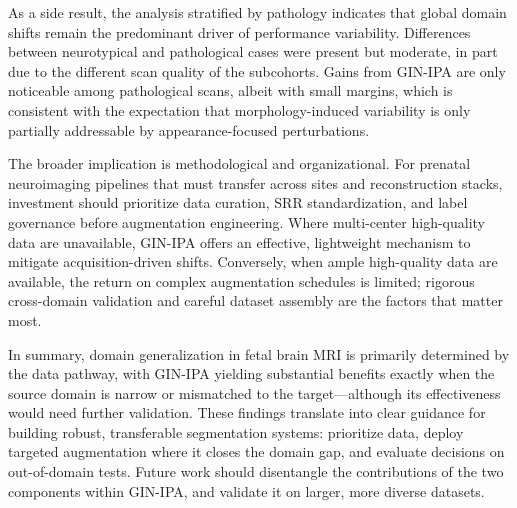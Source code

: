 As a side result, the analysis stratified by pathology indicates that global domain shifts remain the predominant driver of performance variability. Differences between neurotypical and pathological cases were present but moderate, in part due to the different scan quality of the subcohorts. Gains from GIN-IPA are only noticeable among pathological scans, albeit with small margins, which is consistent with the expectation that morphology-induced variability is only partially addressable by appearance-focused perturbations.

The broader implication is methodological and organizational. For prenatal neuroimaging pipelines that must transfer across sites and reconstruction stacks, investment should prioritize data curation, SRR standardization, and label governance before augmentation engineering. Where multi-center high-quality data are unavailable, GIN-IPA offers an effective, lightweight mechanism to mitigate acquisition-driven shifts. Conversely, when ample high-quality data are available, the return on complex augmentation schedules is limited; rigorous cross-domain validation and careful dataset assembly are the factors that matter most.

In summary, domain generalization in fetal brain MRI is primarily determined by the data pathway, with GIN-IPA yielding substantial benefits exactly when the source domain is narrow or mismatched to the target---although its effectiveness would need further validation. These findings translate into clear guidance for building robust, transferable segmentation systems: prioritize data, deploy targeted augmentation where it closes the domain gap, and evaluate decisions on out-of-domain tests. Future work should disentangle the contributions of the two components within GIN-IPA, and validate it on larger, more diverse datasets.
